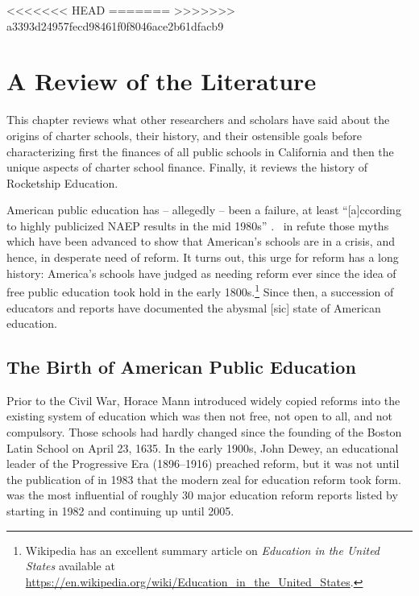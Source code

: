 <<<<<<< HEAD
=======
>>>>>>> a3393d24957fecd98461f0f8046ace2b61dfacb9

\chapter{A Review of the Literature}\label{ch:litreview}
\bigskip%
This chapter reviews what other researchers and scholars have said about the origins of charter schools, their history, and their ostensible goals before characterizing first the finances of all public schools in California and then the unique aspects of charter school finance. Finally, it reviews the history of Rocketship Education.

American public education has – allegedly – been a failure, at least ``[a]ccording to highly publicized NAEP results in the mid 1980s'' \parencite{Gove.Meier2000}. \textcite{Berliner.Glass2014} in  refute those myths which have been advanced to show that American's schools are in a crisis, and hence, in desperate need of reform. It turns out, this urge for reform has a long history: America's schools have judged as needing reform ever since the idea of free public education took hold in the early 1800s.\footnote{Wikipedia has an excellent summary article on \textit{Education in the United States} available at \url{https://en.wikipedia.org/wiki/Education_in_the_United_States}.} Since then, a succession of educators and reports have documented the abysmal [sic] state of American education.

\section{The Birth of American Public Education}\label{sec:birth-amer-publ}\indent

Prior to the Civil War, Horace Mann introduced widely copied reforms \parencite%
{Pulliam.VanPatten2007} into the existing system of education which was then not free, not open to all, and not compulsory. Those schools had hardly changed since the founding of the Boston Latin School on April 23, 1635. In the early 1900s, John Dewey, an educational leader of the Progressive Era (1896–1916) preached reform, but it was not until the publication of  in 1983 that the modern zeal for education reform took form.  was the most influential of roughly 30  major education reform reports listed by \textcite%
{Pulliam.VanPatten2007} starting in 1982 and continuing up until 2005.

